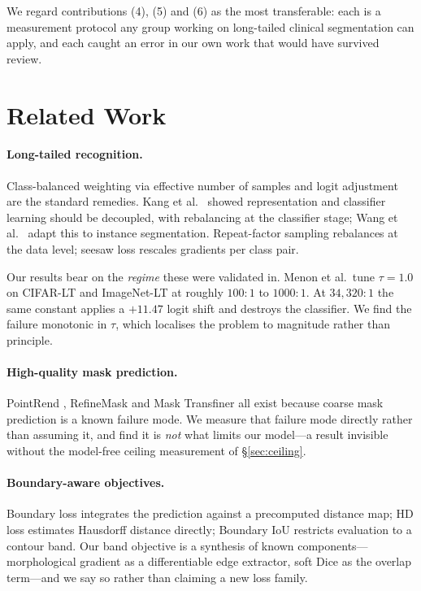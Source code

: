 \documentclass[10pt,twocolumn,letterpaper]{article}
\begin{document}
We regard contributions (4), (5) and (6) as the most transferable: each is a
measurement protocol any group working on long-tailed clinical segmentation can
apply, and each caught an error in our own work that would have survived review.

\section{Related Work}

\paragraph{Long-tailed recognition.} Class-balanced weighting via effective
number of samples \cite{cui2019classbalanced} and logit adjustment \cite{menon2021logit} are the standard remedies. Kang et al.\ \cite{kang2020decoupling} showed
representation and classifier learning should be decoupled, with rebalancing at
the classifier stage; Wang et al.\ \cite{wang2019calibration} adapt this to instance
segmentation. Repeat-factor sampling \cite{gupta2019lvis} rebalances at the
data level; seesaw loss \cite{wang2021seesaw} rescales gradients per class
pair.

Our results bear on the \emph{regime} these were validated in. Menon et al.\ tune
$\tau=1.0$ on CIFAR-LT and ImageNet-LT at roughly $100{:}1$ to $1000{:}1$. At
$34{,}320{:}1$ the same constant applies a $+11.47$ logit shift and destroys the
classifier. We find the failure monotonic in $\tau$, which localises the problem
to magnitude rather than principle.

\paragraph{High-quality mask prediction.} PointRend \cite{kirillov2020pointrend},
RefineMask \cite{zhang2021refinemask} and Mask Transfiner \cite{ke2022transfiner}
all exist because coarse mask prediction is a known failure mode. We measure that
failure mode directly rather than assuming it, and find it is \emph{not} what
limits our model---a result invisible without the model-free ceiling measurement
of \S\ref{sec:ceiling}.

\paragraph{Boundary-aware objectives.} Boundary loss \cite{kervadec2018boundary} integrates the prediction against a precomputed distance map; HD loss
\cite{karimi2019hausdorff} estimates Hausdorff distance directly; Boundary
IoU \cite{cheng2021boundaryiou} restricts evaluation to a contour band. Our band
objective is a synthesis of known components---morphological gradient as a
differentiable edge extractor, soft Dice as the overlap term---and we say so
rather than claiming a new loss family.
\end{document}
